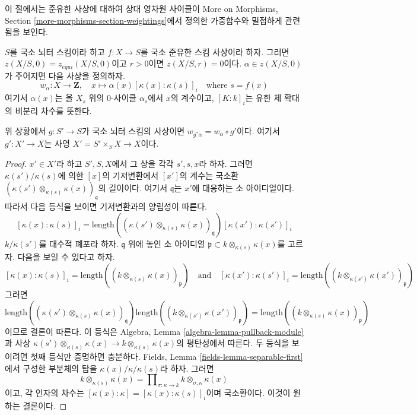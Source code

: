 \noindent
이 절에서는 준유한 사상에 대하여 상대 영차원 사이클이 More on
Morphisms, Section \ref{more-morphisms-section-weightings}에서 정의한
가중함수와 밀접하게 관련됨을 보인다.

\medskip\noindent
$S$를 국소 뇌터 스킴이라 하고 $f : X \to S$를 국소 준유한 스킴
사상이라 하자. 그러면 $z(X/S, 0) = z_{equi}(X/S, 0)$이고
$r > 0$이면 $z(X/S, r) = 0$이다. $\alpha \in z(X/S, 0)$가 주어지면
다음 사상을 정의하자.
$$
w_\alpha : X \longrightarrow \mathbf{Z},\quad
x \mapsto \alpha(x) [\kappa(x) : \kappa(s)]_i \quad\text{where }s = f(x)
$$
여기서 $\alpha(x)$는 올 $X_s$ 위의 $0$-사이클 $\alpha_s$에서
$x$의 계수이고, $[K : k]_i$는 유한 체 확대의 비분리 차수를 뜻한다.

\begin{lemma}
\label{lemma-weightings-pre}
위 상황에서 $g : S' \to S$가 국소 뇌터 스킴의 사상이면
$w_{g^*\alpha} = w_\alpha \circ g'$이다. 여기서
$g' : X' \to X$는 사영 $X' = S' \times_S X \to X$이다.
\end{lemma}

\begin{proof}
$x' \in X'$라 하고 $S', S, X$에서 그 상을 각각 $s', s, x$라
하자. 그러면 $\kappa(s')/\kappa(s)$에 의한 $[x]$의 기저변환에서
$[x']$의 계수는 국소환
$(\kappa(s') \otimes_{\kappa(s)} \kappa(x))_\mathfrak q$의 길이이다.
여기서 $\mathfrak q$는 $x'$에 대응하는 소 아이디얼이다. 따라서
다음 등식을 보이면 기저변환과의 양립성이 따른다.
$$
[\kappa(x) : \kappa(s)]_i =
\text{length}((\kappa(s') \otimes_{\kappa(s)} \kappa(x))_\mathfrak q)
[\kappa(x') : \kappa(s')]_i
$$
$k/\kappa(s')$를 대수적 폐포라 하자. $\mathfrak q$ 위에 놓인 소
아이디얼 $\mathfrak p \subset k \otimes_{\kappa(s)} \kappa(x)$를
고르자. 다음을 보일 수 있다고 하자.
$$
[\kappa(x) : \kappa(s)]_i =
\text{length}((k \otimes_{\kappa(s)} \kappa(x))_\mathfrak p)
\quad\text{and}\quad
[\kappa(x') : \kappa(s')]_i =
\text{length}((k \otimes_{\kappa(s')} \kappa(x'))_\mathfrak p)
$$
그러면
$$
\text{length}((\kappa(s') \otimes_{\kappa(s)} \kappa(x))_\mathfrak q)
\text{length}((k \otimes_{\kappa(s')} \kappa(x'))_\mathfrak p)
=
\text{length}((k \otimes_{\kappa(s)} \kappa(x))_\mathfrak p)
$$
이므로 결론이 따른다. 이 등식은 Algebra, Lemma
\ref{algebra-lemma-pullback-module}과 사상
$\kappa(s') \otimes_{\kappa(s)} \kappa(x) \to
k \otimes_{\kappa(s)} \kappa(x)$의 평탄성에서 따른다.
두 등식을 보이려면 첫째 등식만 증명하면 충분하다.
Fields, Lemma \ref{fields-lemma-separable-first}에서 구성한 부분체의 탑을
$\kappa(x)/\kappa/\kappa(s)$라 하자. 그러면
$$
k \otimes_{\kappa(s)} \kappa(x) =
\prod\nolimits_{\sigma : \kappa \to k}
k \otimes_{\sigma, \kappa} \kappa(x)
$$
이고, 각 인자의 차수는
$[\kappa(x) : \kappa] = [\kappa(x) : \kappa(s)]_i$이며 국소환이다.
이것이 원하는 결론이다.
\end{proof}

